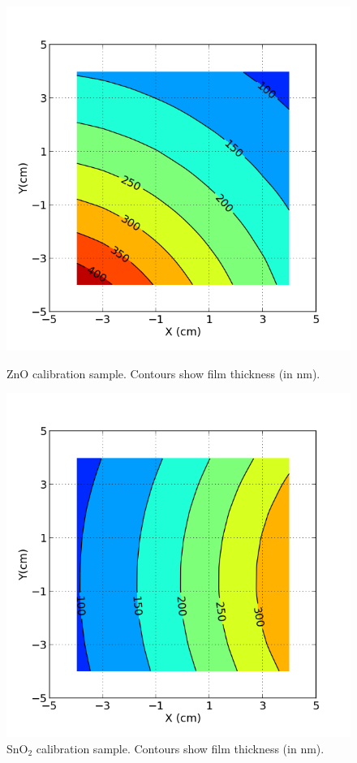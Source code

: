 \documentclass{article}
\begin{document}
\begin{figure}[ht]
\begin{minipage}[b]{0.45\linewidth}
\centering
\includegraphics[width=\textwidth]{ZnO_profile.png}
\caption{\label{fig:1} ZnO calibration sample. Contours show film thickness (in nm).}
\end{minipage}
\hspace{0.5cm}
\begin{minipage}[b]{0.45\linewidth}
\centering
\includegraphics[width=\textwidth]{SnO2_profile.png}
\caption{\label{fig:2} SnO$_2$ calibration sample. Contours show film thickness (in nm).}
\end{minipage}
\end{figure}
\end{document}

